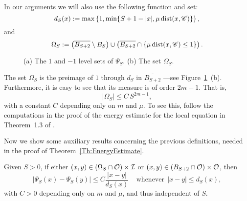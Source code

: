 In our arguments we will also use the following function and set:
$$ 
d_S(x) := \max\left\{1,\min\{S+1-|x|,\mu \operatorname{dist}(x,\mathscr{C})\} \right\},  
$$
and
\begin{equation}
\label{Eq:DefOmegaS}
\Omega_S := \left( \overline{B_{S+2}}\setminus B_S \right) \cup \left(  \overline{B_{S+2}} \cap \{\mu \operatorname{dist}(x,\mathscr{C}) \leq 1\}\right).
\end{equation} 

\begin{figure}
	\centering
	\hspace{-0.32\textwidth}
	\begin{subfigure}{0.21\textwidth}
		\centering
		
	\end{subfigure}
	\hspace{0.28\textwidth}
	\begin{subfigure}{0.21\textwidth}
		\centering
		
	\end{subfigure}
	\caption{(a) The $1$ and $-1$ level sets of $\Psi_S$. (b) The set $\Omega_S$.}
	\label{Fig:PsiSandOmegaS}
\end{figure}

The set $\Omega_S$ is the preimage of $1$ through $d_S$ in $\overline{B_{S+2}}$ ---see Figure~\ref{Fig:PsiSandOmegaS}~(b). Furthermore, it is easy to see that its measure is of order $2m-1$. That is,
\begin{equation}
\label{Eq:MeasureOmegaS}
|\Omega_S| \leq C\,S^{2m-1},
\end{equation}
with a constant $C$ depending only on $m$ and $\mu$. To see this, follow the computations in the proof of the energy estimate for the local equation in Theorem~1.3 of \cite{CabreTerraI}.


Now we show some auxiliary results concerning the previous definitions, needed in the proof of Theorem~\ref{Th:EnergyEstimate}.

\begin{lemma}
\label{Lemma:AdaptedLipschitzConditionWith_dFunction}
Given $S>0$, if either $(x,y) \in \left(\Omega_S\cap \mathcal{O}\right) \times \mathcal{I}$ or $(x,y)\in \left(B_{S+2}\cap \mathcal{O}\right) \times \mathcal{O}$, then
$$ 
|\Psi_S(x) - \Psi_S(y)| \leq C \frac{|x-y|}{d_S(x)} \ \ \ \ \ \textrm{whenever} \ \ |x-y|\leq d_S(x), 
$$
with $C>0$ depending only on $m$ and $\mu$, and thus independent of $S$.
\end{lemma}

